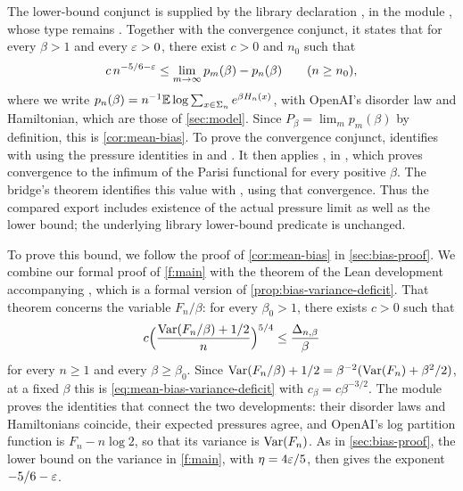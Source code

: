 The lower-bound conjunct is supplied by the library declaration
,
in the module , whose type remains
. Together with the
convergence conjunct, it states that for every $\beta>1$ and every
$\varepsilon>0$, there exist $c>0$ and $n_0$ such that
\[
 c\,n^{-5/6-\varepsilon}\le\lim_{m\to\infty}p_m(\beta)-p_n(\beta)\qquad(n\ge n_0),
\]
where we write $p_n(\beta)=n^{-1}\mathbb E\log\sum_{x\in\Sigma_n}e^{\beta H_n(x)}$, with OpenAI's disorder law and Hamiltonian, which are those of \cref{sec:model}. Since $P_\beta=\lim_mp_m(\beta)$ by definition, this is \cref{cor:mean-bias}. To prove the convergence conjunct,  identifies  with  using the pressure identities in  and . It then applies , in , which proves convergence to the infimum of the Parisi functional for every positive $\beta$. The bridge's theorem  identifies this value with , using that convergence. Thus the compared export includes existence of the actual pressure limit as well as the lower bound; the underlying library lower-bound predicate is unchanged.

To prove this bound, we follow the proof of \cref{cor:mean-bias} in \cref{sec:bias-proof}. We combine our formal proof of \cref{f:main} with the theorem  of the Lean development \cite{hexagon-bias-lean} accompanying \cite{hexagon-bias}, which is a formal version of \cref{prop:bias-variance-deficit}. That theorem concerns the variable $F_n/\beta$: for every $\beta_0>1$, there exists $c>0$ such that
\[
 c\Bigl(\frac{\operatorname{Var}(F_n/\beta)+1/2}{n}\Bigr)^{5/4}\le\frac{\Delta_{n,\beta}}{\beta}
\]
for every $n\ge1$ and every $\beta\ge\beta_0$. Since $\operatorname{Var}(F_n/\beta)+1/2=\beta^{-2}(\operatorname{Var}(F_n)+\beta^2/2)$, at a fixed $\beta$ this is \eqref{eq:mean-bias-variance-deficit} with $c_\beta=c\beta^{-3/2}$. The module  proves the identities that connect the two developments: their disorder laws and Hamiltonians coincide, their expected pressures agree, and OpenAI's log partition function is $F_n-n\log2$, so that its variance is $\operatorname{Var}(F_n)$. As in \cref{sec:bias-proof}, the lower bound on the variance in \cref{f:main}, with $\eta=4\varepsilon/5$, then gives the exponent $-5/6-\varepsilon$.

